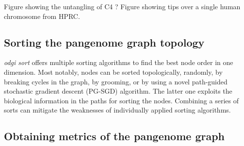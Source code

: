 \documentclass{bioinfo}
\begin{document}

Figure showing the untangling of C4 ?
Figure showing tips over a single human chromosome from HPRC.

\subsection{Sorting the pangenome graph topology}
\label{sec:sort}





\textit{odgi sort} offers multiple sorting algorithms to find the best node order in one dimension. Most notably, nodes can be sorted topologically, randomly, by breaking cycles in the graph, by grooming, or by using a novel path-guided stochastic gradient descent (PG-SGD) algorithm.
The latter one exploits the biological information in the paths for sorting the nodes.
Combining a series of sorts can mitigate the weaknesses of individually applied sorting algorithms.


\subsection{Obtaining metrics of the pangenome graph}
\label{sec:metrics}
\end{document}
